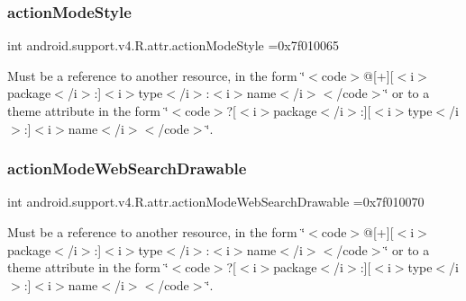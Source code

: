 \subsubsection{\texorpdfstring{action\+Mode\+Style}{actionModeStyle}}
{\footnotesize\ttfamily int android.\+support.\+v4.\+R.\+attr.\+action\+Mode\+Style =0x7f010065\hspace{0.3cm}{\ttfamily [static]}}

Must be a reference to another resource, in the form \char`\"{}$<$code$>$@\mbox{[}+\mbox{]}\mbox{[}$<$i$>$package$<$/i$>$\+:\mbox{]}$<$i$>$type$<$/i$>$\+:$<$i$>$name$<$/i$>$$<$/code$>$\char`\"{} or to a theme attribute in the form \char`\"{}$<$code$>$?\mbox{[}$<$i$>$package$<$/i$>$\+:\mbox{]}\mbox{[}$<$i$>$type$<$/i$>$\+:\mbox{]}$<$i$>$name$<$/i$>$$<$/code$>$\char`\"{}. \mbox{\label{classandroid_1_1support_1_1v4_1_1R_1_1attr_ab88c21eea7bf54bfd711c9326ca83fc3}} 
\subsubsection{\texorpdfstring{action\+Mode\+Web\+Search\+Drawable}{actionModeWebSearchDrawable}}
{\footnotesize\ttfamily int android.\+support.\+v4.\+R.\+attr.\+action\+Mode\+Web\+Search\+Drawable =0x7f010070\hspace{0.3cm}{\ttfamily [static]}}

Must be a reference to another resource, in the form \char`\"{}$<$code$>$@\mbox{[}+\mbox{]}\mbox{[}$<$i$>$package$<$/i$>$\+:\mbox{]}$<$i$>$type$<$/i$>$\+:$<$i$>$name$<$/i$>$$<$/code$>$\char`\"{} or to a theme attribute in the form \char`\"{}$<$code$>$?\mbox{[}$<$i$>$package$<$/i$>$\+:\mbox{]}\mbox{[}$<$i$>$type$<$/i$>$\+:\mbox{]}$<$i$>$name$<$/i$>$$<$/code$>$\char`\"{}. \mbox{\label{classandroid_1_1support_1_1v4_1_1R_1_1attr_a32592f9d2b2349d58f91a3caf7a05337}} 
